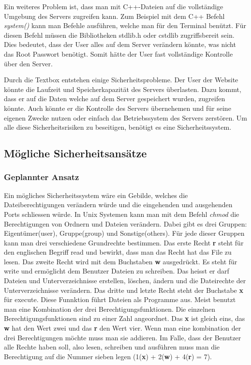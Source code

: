\documentclass[10pt]{article}
\begin{document}
	Ein weiteres Problem ist, dass man mit C++-Dateien auf die vollständige Umgebung des Servers zugreifen kann. Zum Beispiel mit dem C++ Befehl \textit{system()} kann man Befehle ausführen, welche man für den Terminal benützt. Für diesen Befehl müssen die Bibliotheken stdlib.h oder cstdlib zugriffsbereit sein.\cite{systemcpp} Dies bedeutet, dass der User alles auf dem Server verändern könnte, was nicht das Root Passwort benötigt. %
	Somit hätte der User fast vollständige Kontrolle über den Server.
	
	Durch die Textbox entstehen einige Sicherheitsprobleme. Der User der Website könnte die Laufzeit und Speicherkapazität des Servers überlasten. Dazu kommt, dass er auf die Daten welche auf dem Server gespeichert wurden, zugreifen könnte. Auch könnte er die Kontrolle des Servers übernehemen und für seine eigenen Zwecke nutzen oder einfach das Betriebssystem des Servers zerstören. Um alle diese Sicherheitsrisiken zu beseitigen, benötigt es eine Sicherheitssystem.
	
	\pagebreak
		
		
	\subsection{Mögliche Sicherheitsansätze}
	
		\subsubsection{Geplannter Ansatz}
	Ein mögliches Sicherheitssystem wäre ein Gebilde, welches die Dateiberechtigungen verändern würde und die eingehenden und ausgehenden Ports schliessen würde. In Unix Systemen kann man mit dem Befehl \textit{chmod}  die Berechtigungen von Ordnern und Dateien verändern. Dabei gibt es drei Gruppen: Eigentümer(user), Gruppe(group) und Sonstige(others). Für jede dieser Gruppen kann man drei verschiedene Grundrechte bestimmen. Das erste Recht \textbf{r} steht für den englischen Begriff read und bewirkt, dass man das Recht hat das File zu lesen. Das zweite Recht wird mit dem Buchstaben \textbf{w} ausgedrückt. Es steht für write und ermöglicht dem Benutzer Dateien zu schreiben. Das heisst er darf Dateien und Unterverzeichnisse erstellen, löschen, ändern und die Dateirechte der Unterverzeichnisse verändern. Das dritte und letzte Recht steht der Buchstabe \textbf{x} für execute. Diese Funnktion führt Dateien als Programme aus. Meist benutzt man eine Kombination der drei Berechtigungsfunktionen. Die einzelnen Berechtigungsfunktionen sind zu einer Zahl angeordnet. Das \textbf{x} ist gleich eins, das \textbf{w} hat den Wert zwei und das \textbf{r} den Wert vier. Wenn man eine kombination der drei Berechtigungen möchte muss man sie addieren. Im Falle, dass der  Benutzer alle Rechte haben soll, also lesen, schreiben und ausführen muss man die Berechtigung auf die Nummer sieben legen (1(\textbf{x}) + 2(\textbf{w}) + 4(\textbf{r}) = 7). 
	
\end{document}
